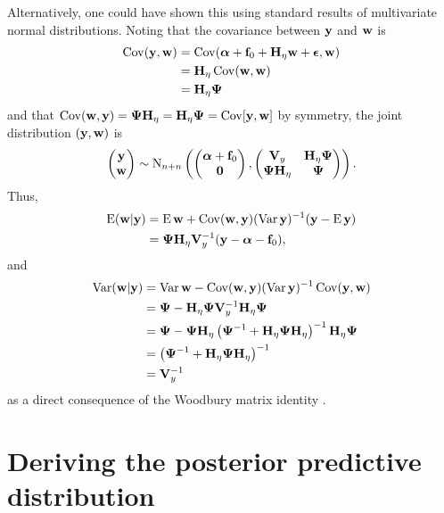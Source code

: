 Alternatively, one could have shown this using standard results of multivariate normal distributions.
Noting that the covariance between $\by$ and $\bw$ is  %
\begin{align*}
  \Cov(\by,\bw)
  &= \Cov(\balpha + \bff_0 + \bH_\eta\bw + \bepsilon, \bw) \\
  &= \bH_\eta\Cov(\bw,\bw) \\
  &= \bH_\eta\bPsi 
\end{align*}
and that $\Cov(\bw,\by) = \bPsi\bH_\eta = \bH_\eta\bPsi = \Cov[\by,\bw]$ by symmetry, the joint distribution $(\by,\bw)$ is
\[
  \begin{pmatrix}
    \by \\
    \bw
  \end{pmatrix}
  \sim \N_{n+n}
  \left(
    \begin{pmatrix}
      \balpha + \bff_0 \\
      \bzero
    \end{pmatrix},
    \begin{pmatrix}
      \bV_y         & \bH_\eta\bPsi \\
      \bPsi\bH_\eta & \bPsi \\
    \end{pmatrix}
  \right).
\] 
Thus,
\begin{align*}
  \E (\bw|\by)
  &= \E \bw + \Cov(\bw,\by) (\Var \by)^{-1} (\by - \E \by) \\
  &= \bPsi\bH_\eta\bV_y^{-1}(\by - \balpha - \bff_0),
\end{align*}
and
\begin{align*}
  \Var (\bw|\by)
  &= \Var \bw - \Cov(\bw,\by) (\Var \by)^{-1} \Cov(\by,\bw) \\
  &= \bPsi - \bH_\eta\bPsi\bV_y^{-1}\bH_\eta\bPsi \\
  &= \bPsi - \bPsi\bH_\eta \left(\bPsi^{-1} + \bH_\eta\bPsi\bH_\eta \right)^{-1}\bH_\eta\bPsi  \\
  &= \left(\bPsi^{-1} + \bH_\eta\bPsi\bH_\eta \right)^{-1} \\
  &= \bV_y^{-1}
\end{align*}
as a direct consequence of the Woodbury matrix identity \citep[Eq. 156, Sec. 3.2.2]{petersen2008matrix}.

\section{Deriving the posterior predictive distribution}
\label{apx:postpred}

